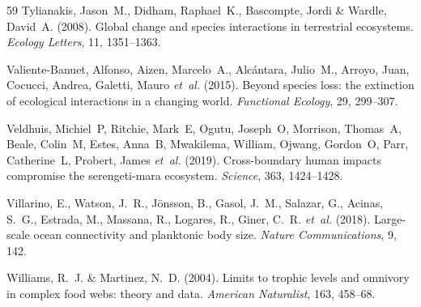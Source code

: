 \documentclass[11pt]{article}
\begin{document}
\begin{thebibliography}{59}
Tylianakis, Jason~M., Didham, Raphael~K., Bascompte, Jordi \& Wardle, David~A.
  (2008).
\newblock Global change and species interactions in terrestrial ecosystems.
\newblock \emph{Ecology Letters}, 11, 1351--1363.

Valiente-Banuet, Alfonso, Aizen, Marcelo~A., Alcántara, Julio~M., Arroyo,
  Juan, Cocucci, Andrea, Galetti, Mauro \emph{et~al.} (2015).
\newblock Beyond species loss: the extinction of ecological interactions in a
  changing world.
\newblock \emph{Functional Ecology}, 29, 299--307.

Veldhuis, Michiel~P, Ritchie, Mark~E, Ogutu, Joseph~O, Morrison, Thomas~A,
  Beale, Colin~M, Estes, Anna~B, Mwakilema, William, Ojwang, Gordon~O, Parr,
  Catherine~L, Probert, James \emph{et~al.} (2019).
\newblock Cross-boundary human impacts compromise the serengeti-mara ecosystem.
\newblock \emph{Science}, 363, 1424--1428.

Villarino, E., Watson, J.~R., J{\"o}nsson, B., Gasol, J.~M., Salazar, G.,
  Acinas, S.~G., Estrada, M., Massana, R., Logares, R., Giner, C.~R.
  \emph{et~al.} (2018).
\newblock Large-scale ocean connectivity and planktonic body size.
\newblock \emph{Nature Communications}, 9, 142.

Williams, R.~J. \& Martinez, N.~D. (2004).
\newblock Limits to trophic levels and omnivory in complex food webs: theory
  and data.
\newblock \emph{American Naturalist}, 163, 458--68.

\end{thebibliography}
\end{document}
